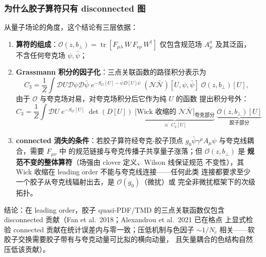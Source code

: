 \documentclass[11pt,a4paper]{ctexart}
\newcommand{\trc}{\operatorname{tr}}
\newcommand{\order}[1]{\mathcal{O}(#1)}
\newcommand{\bperp}{b_{\perp}}
\begin{document}
\subsubsection{为什么胶子算符只有 disconnected 图}

从量子场论的角度，这个结论有三层依据：

\begin{enumerate}
  \item \textbf{算符的组成}：$\mathcal O(z,\bperp)
  =\trc[F_{\mu\lambda}\,W\,F_{\nu\rho}\,W^\dagger]$ 仅包含规范场
  $A_\mu^a$ 及其泛函，不含任何夸克场 $\psi,\bar\psi$；
  \item \textbf{Grassmann 积分的因子化}：三点关联函数的路径积分表示为
  \begin{equation}
  C_3 = \frac{1}{Z} \int \mathcal{D}U \mathcal{D}\psi \mathcal{D}\bar\psi
  \; e^{-S_G[U]-\bar\psi D[U]\psi} \;
  (\mathcal{N}\bar{\mathcal{N}})[U,\psi,\bar\psi]\;
  \mathcal{O}(z,\bperp)[U],
  \end{equation}
  由于 $\mathcal O$ 与夸克场对易，对夸克场积分后它作为纯 $U$ 的函数
  提出积分号外：
  \begin{equation}
  C_3 = \frac{1}{Z} \int \mathcal{D}U \; e^{-S_G[U]} \; \det(D[U]) \;
  \underbrace{\big[\text{Wick 收缩的 } \mathcal{N}\bar{\mathcal{N}}
  \big]_{\text{夸克部分}}}_{\equiv\; C_2[U]}
  \;\underbrace{\mathcal{O}(z,\bperp)[U]}_{\text{胶子部分}}
  \label{eq:grassmann-factorization}
  \end{equation}
  \item \textbf{connected 消失的条件}：若胶子算符经夸克-胶子顶点
  $g_0\bar\psi\gamma^\mu A_\mu\psi$ 与夸克线耦合，需要 $F_{\mu\nu}$ 中
  的规范链接与夸克传播子共享量子涨落；但 $\mathcal O(z,\bperp)$ 是
  \textbf{规范不变的整体算符}（场强由 clover 定义、Wilson 线保证规范
  不变性），其 Wick 收缩在 leading order 不能与夸克线连接——任何此类
  连接都要求至少一个胶子从夸克线辐射出去，是 $\order{g_0}$（微扰）或
  完全非微扰框架下的次级拓扑。
\end{enumerate}
结论：在 leading order，胶子 quasi-PDF/TMD 的三点关联函数仅包含
disconnected 贡献（Fan et al.\ 2018；Alexandrou et al.\ 2021 已在格点
上显式检验 connected 贡献在统计误差内与零一致；压低机制与色因子
$\sim1/N_c$ 相关——软胶子交换需要胶子带有与夸克动量可比拟的横向动量，
且矢量耦合的色结构自然压低该贡献）。
\end{document}
